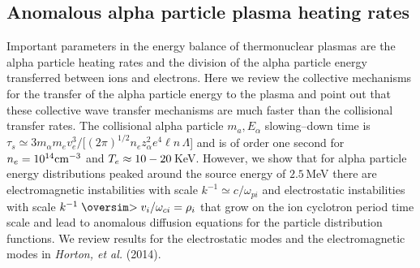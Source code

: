 \documentclass[a4paper,openany,12pt]{book}
\def\nms{\mathsurround=0pt}
\def\gtsim{\mathrel{\mathpalette\oversim>}} %
\def\oversim#1#2{\lower 2pt\vbox{\baselineskip 0pt \lineskip 1pt
    \ialign{$\nms#1\hfil##\hfil$\crcr#2\crcr\sim\crcr}}}
\begin{document}
\subsection{Anomalous alpha particle plasma heating rates}

Important parameters in the energy balance of thermonuclear plasmas are the alpha particle heating rates and the division of the alpha particle energy transferred between ions and electrons. Here we review the collective mechanisms for the transfer of the alpha particle energy to the plasma and point out that these collective wave transfer mechanisms are much faster than the collisional transfer rates. The collisional alpha particle $m_a, E_\alpha$ slowing--down time is $\tau_s\simeq 3 m_\alpha m_e v^3_e/[(2\pi)^{1/2} n_e z^2_\alpha e^4\ell n\, \Lambda$] and is of order one second for $n_e = 10^{14}\rm cm^{-3}$ and $T_e\approx \rm 10-20\,$KeV. However, we show that for alpha particle energy distributions peaked around the source energy of $2.5\,$MeV there are electromagnetic instabilities with scale $k^{-1}\simeq c/\omega_{pi}$ and electrostatic instabilities with scale $k^{-1}\gtsim v_i/\omega_{ci}=\rho_i$ that grow on the ion cyclotron period time scale and lead to anomalous diffusion equations for the particle distribution functions. We review results for the electrostatic modes and the electromagnetic modes in \emph{Horton, et al.} (2014).
\end{document}
